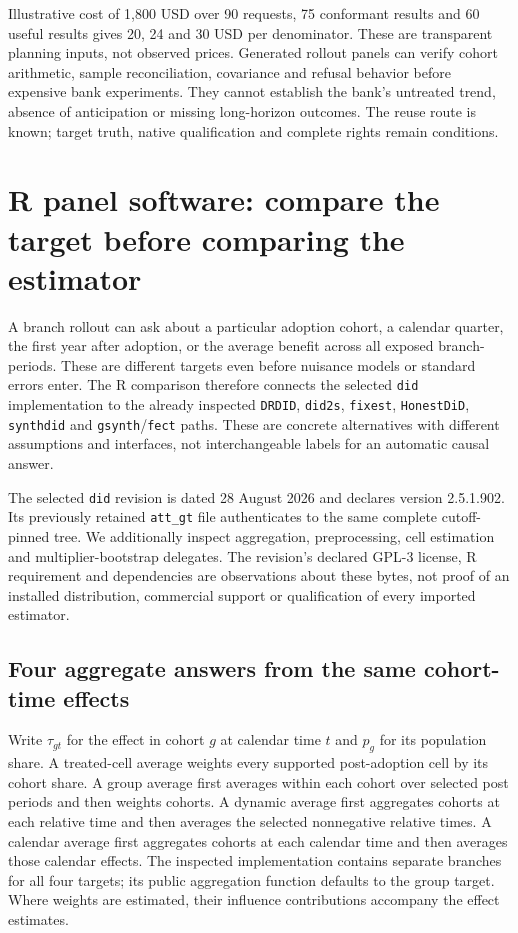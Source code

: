 Illustrative cost of 1,800 USD over 90 requests, 75 conformant results and 60
useful results gives 20, 24 and 30 USD per denominator. These are transparent
planning inputs, not observed prices. Generated rollout panels can verify
cohort arithmetic, sample reconciliation, covariance and refusal behavior before
expensive bank experiments. They cannot establish the bank's untreated trend,
absence of anticipation or missing long-horizon outcomes. The reuse route is
known; target truth, native qualification and complete rights remain conditions.
\citep{exec24_eventstudy_contract}


\section{R panel software: compare the target before comparing the estimator}
\label{sec:exec24-panels-r}

A branch rollout can ask about a particular adoption cohort, a calendar
quarter, the first year after adoption, or the average benefit across all
exposed branch-periods. These are different targets even before nuisance
models or standard errors enter. The R comparison therefore connects the
selected \texttt{did} implementation to the already inspected
\texttt{DRDID}, \texttt{did2s}, \texttt{fixest}, \texttt{HonestDiD},
\texttt{synthdid} and \texttt{gsynth}/\texttt{fect} paths. These are concrete
alternatives with different assumptions and interfaces, not interchangeable
labels for an automatic causal answer.
\citep{exec24_panelr_contract}

The selected \texttt{did} revision is dated 28 August 2026 and declares
version 2.5.1.902. Its previously retained \texttt{att\_gt} file authenticates
to the same complete cutoff-pinned tree. We additionally inspect aggregation,
preprocessing, cell estimation and multiplier-bootstrap delegates. The
revision's declared GPL-3 license, R requirement and dependencies are
observations about these bytes, not proof of an installed distribution,
commercial support or qualification of every imported estimator.
\citep{exec24_panelr_did}

\subsection{Four aggregate answers from the same cohort-time effects}
Write $\tau_{gt}$ for the effect in cohort $g$ at calendar time $t$ and $p_g$
for its population share. A treated-cell average weights every supported
post-adoption cell by its cohort share. A group average first averages within
each cohort over selected post periods and then weights cohorts. A dynamic
average first aggregates cohorts at each relative time and then averages the
selected nonnegative relative times. A calendar average first aggregates
cohorts at each calendar time and then averages those calendar effects.
The inspected implementation contains separate branches for all four targets;
its public aggregation function defaults to the group target. Where weights
are estimated, their influence contributions accompany the effect estimates.
\citep{exec24_panelr_did}

